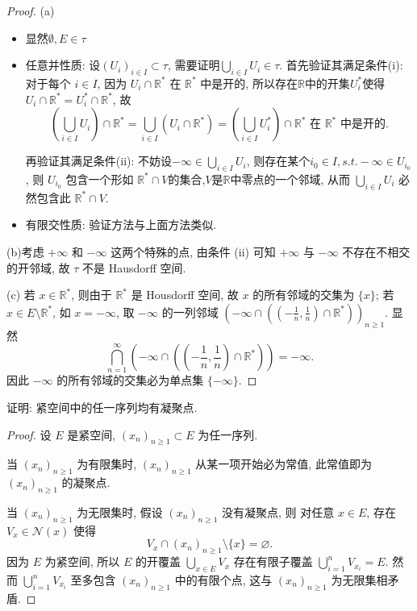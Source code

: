 \begin{proof}
(a)
\begin{itemize}
\item 显然$\emptyset,E\in\tau$
\item 任意并性质: 设$(U_i)_{i\in I}\subset\tau$, 需要证明$\bigcup_{i\in I}U_i\in\tau$.
首先验证其满足条件(i): 对于每个 $i\in I$, 因为 $U_i\cap\mathbb{R}^*$ 在 $\mathbb{R}^*$ 中是开的, 
所以存在$\mathbb{R}$中的开集$U_i^*$使得$U_i\cap\mathbb{R}^*=U_i^*\cap\mathbb{R}^*$, 故
\[\left(\bigcup_{i\in I}U_i\right)\cap\mathbb{R}^*=\bigcup_{i\in I}\left(U_i\cap\mathbb{R}^*\right)=\left(\bigcup_{i\in I}U_i^*\right)\cap\mathbb{R}^*\text{\ 在\ }\mathbb{R}^*\text{\ 中是开的}.\]

再验证其满足条件(ii): 不妨设$-\infty\in\bigcup_{i\in I}U_i$, 则存在某个$i_0\in I,s.t.-\infty\in U_{i_0}$,
则 $U_{i_0}$ 包含一个形如 $\mathbb{R}^*\cap V$的集合,$V$是$\mathbb{R}$中零点的一个邻域,
从而 $\bigcup_{i\in I}U_i$ 必然包含此 $\mathbb{R}^*\cap V$.
\item 有限交性质: 验证方法与上面方法类似.
\end{itemize}

(b)考虑 $+\infty$ 和 $-\infty$ 这两个特殊的点, 由条件 (ii) 可知 $+\infty$ 与 $-\infty$
不存在不相交的开邻域, 故 $\tau$ 不是 Hausdorff 空间.

(c) 若 $x\in\mathbb{R}^*$, 则由于 $\mathbb{R}^*$ 是 Housdorff 空间, 故 $x$ 的所有邻域的交集为 $\{x\}$;
若 $x\in E\setminus\mathbb{R}^*$, 如 $x=-\infty$, 取 $-\infty$ 的一列邻域
$\left(-\infty\cap((-\frac{1}{n},\frac{1}{n})\cap\mathbb{R}^*)\right)_{n\geq 1}$. 显然
\[\bigcap_{n=1}^{\infty}\left(-\infty\cap((-\frac{1}{n},\frac{1}{n})\cap\mathbb{R}^*)\right)=-\infty.\]
因此 $-\infty$ 的所有邻域的交集必为单点集 $\{-\infty\}$.
\end{proof}

\begin{exercise}
证明: 紧空间中的任一序列均有凝聚点.
\end{exercise}

\begin{proof}
设 $E$ 是紧空间, $(x_n)_{n\geq 1}\subset E$ 为任一序列.

当 $(x_n)_{n\geq 1}$ 为有限集时, $(x_n)_{n\geq 1}$ 从某一项开始必为常值,
此常值即为 $(x_n)_{n\geq 1}$ 的凝聚点.

当 $(x_n)_{n\geq 1}$ 为无限集时, 假设 $(x_n)_{n\geq 1}$ 没有凝聚点, 则
对任意 $x\in E$, 存在 $V_x\in\mathcal{N}(x)$ 使得
\[V_x\cap (x_n)_{n\geq 1}\setminus\{x\}=\varnothing.\]
因为 $E$ 为紧空间, 所以 $E$ 的开覆盖 $\bigcup_{x\in E}V_x$ 存在有限子覆盖 $\bigcup_{i=1}^n V_{x_i}=E$.
然而 $\bigcup_{i=1}^n V_{x_i}$ 至多包含 $(x_n)_{n\geq 1}$ 中的有限个点, 这与 $(x_n)_{n\geq 1}$ 为无限集相矛盾.
\end{proof}

